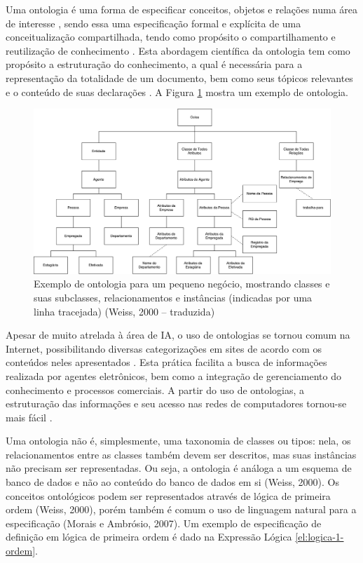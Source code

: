 Uma  ontologia  é  uma  forma  de  especificar  conceitos,  objetos  e  relações  numa área de interesse \cite{WEISS1999}, sendo essa uma especificação formal e explícita de uma conceitualização compartilhada, tendo como propósito o compartilhamento e reutilização de conhecimento \cite{UFG2007}.  Esta abordagem científica da ontologia tem como propósito a estruturação do conhecimento, a qual é necessária para a representação da totalidade de um documento, bem como seus tópicos relevantes e o conteúdo de suas declarações \cite{godert2014}. A Figura \ref{fig:ontologia} mostra um exemplo de ontologia.

\begin{figure}[H]
    \centering
    \caption[Exemplo de Ontologia]{\label{fig:ontologia}Exemplo de ontologia para um pequeno negócio, mostrando classes e suas subclasses, relacionamentos e instâncias (indicadas por uma linha tracejada) (Weiss, 2000 -- traduzida)}
    \includegraphics[width=1\textwidth]{pdf/ontology-weiss.pdf}
\end{figure}

Apesar de muito atrelada à área de IA, o uso de ontologias se tornou comum na Internet, possibilitando diversas categorizações em sites de acordo com os conteúdos neles apresentados \cite{NOY2001}. Esta prática facilita a busca de informações realizada por agentes eletrônicos, bem como a integração de gerenciamento do conhecimento e processos comerciais. A partir do uso de ontologias, a estruturação das informações e seu acesso nas redes de computadores tornou-se mais fácil \cite{MAEDCHE2002}.

Uma ontologia não é, simplesmente, uma taxonomia de classes ou tipos: nela, os relacionamentos entre as classes também devem ser descritos, mas suas instâncias não precisam ser representadas.  Ou seja, a ontologia é análoga a um esquema de banco de dados e não ao conteúdo do banco de dados em si (Weiss, 2000). Os conceitos ontológicos podem ser representados através de lógica de primeira ordem (Weiss, 2000), porém também é comum o uso de linguagem natural para a especificação (Morais e Ambrósio, 2007). Um exemplo de especificação de definição em lógica de primeira ordem é dado na Expressão Lógica \ref{el:logica-1-ordem}.

